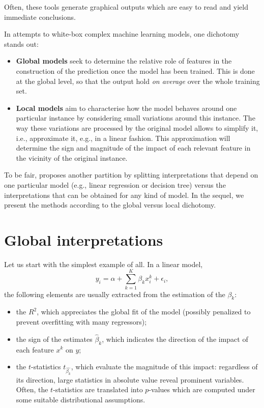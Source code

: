 \documentclass[]{krantz}
\providecommand{\tightlist}{%
  \setlength{\itemsep}{0pt}\setlength{\parskip}{0pt}}
\theoremstyle{definition}
\theoremstyle{definition}
\theoremstyle{definition}
\theoremstyle{remark}
\begin{document}
Often, these tools generate graphical outputs which are easy to read and
yield immediate conclusions.

In attempts to white-box complex machine learning models, one dichotomy
stands out:

\begin{itemize}
\tightlist
\item
  \textbf{Global models} seek to determine the relative role of features
  in the construction of the prediction once the model has been trained.
  This is done at the global level, so that the output hold \emph{on
  average} over the whole training set.\\
\item
  \textbf{Local models} aim to characterise how the model behaves around
  one particular instance by considering small variations around this
  instance. The way these variations are processed by the original model
  allows to simplify it, i.e., approximate it, e.g., in a linear
  fashion. This approximation will determine the sign and magnitude of
  the impact of each relevant feature in the vicinity of the original
  instance.
\end{itemize}

To be fair, \citet{molnar2019interpretable} proposes another partition
by splitting interpretations that depend on one particular model (e.g.,
linear regression or decision tree) versus the interpretations that can
be obtained for any kind of model. In the sequel, we present the methods
according to the global versus local dichotomy.

\hypertarget{global-interpretations}{%
\section{Global interpretations}\label{global-interpretations}}

Let us start with the simplest example of all. In a linear model,
\[y_i=\alpha+\sum_{k=1}^K\beta_kx_i^k+\epsilon_i,\] the following
elements are usually extracted from the estimation of the \(\beta_k\):

\begin{itemize}
\tightlist
\item
  the \(R^2\), which appreciates the global fit of the model (possibly
  penalized to prevent overfitting with many regressors);\\
\item
  the sign of the estimates \(\hat{\beta}_k\), which indicates the
  direction of the impact of each feature \(x^k\) on \(y\);
\item
  the \(t\)-statistics \(t_{\hat{\beta_k}}\), which evaluate the
  magnitude of this impact: regardless of its direction, large
  statistics in absolute value reveal prominent variables. Often, the
  \(t\)-statistics are translated into \(p\)-values which are computed
  under some suitable distributional assumptions.
\end{itemize}
\end{document}
